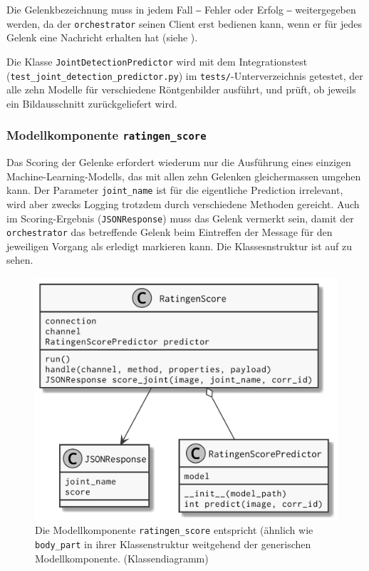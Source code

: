 Die Gelenkbezeichnung muss in jedem Fall ‒ Fehler oder Erfolg ‒ weitergegeben werden, da der \texttt{orchestrator} seinen Client erst bedienen kann, wenn er für jedes Gelenk eine Nachricht erhalten hat (siehe ).

Die Klasse \texttt{JointDetectionPredictor} wird mit dem Integrationstest (\texttt{test\_joint\_de\-tect\-ion\_predictor.py}) im \texttt{tests/}-Unterverzeichnis getestet, der alle zehn Modelle für verschiedene Röntgenbilder ausführt, und prüft, ob jeweils ein Bildausschnitt zurückgeliefert wird.

\subsubsection{Modellkomponente \texttt{ratingen\_score}}

Das Scoring der Gelenke erfordert wiederum nur die Ausführung eines einzigen Machine-Learning-Modells, das mit allen zehn Gelenken gleichermassen umgehen kann. Der Parameter \texttt{joint\_name} ist für die eigentliche Prediction irrelevant, wird aber zwecks Logging trotzdem durch verschiedene Methoden gereicht. Auch im Scoring-Ergebnis (\texttt{JSON\-Re\-sponse}) muss das Gelenk vermerkt sein, damit der \texttt{orchestrator} das betreffende Gelenk beim Eintreffen der Message für den jeweiligen Vorgang als erledigt markieren kann. Die Klassesnstruktur ist auf  zu sehen.

\begin{figure}[tbh]
    \centering
    \includegraphics[width=0.9\linewidth]{pics/class-ratingen-score.png}
    \caption{Die Modellkomponente \texttt{ratingen\_score} entspricht (ähnlich wie \texttt{body\_part} in ihrer Klassenstruktur weitgehend der generischen Modellkomponente. (Klassendiagramm)}
    \label{fig:klassendiagramm-ratingen-score}
\end{figure}

